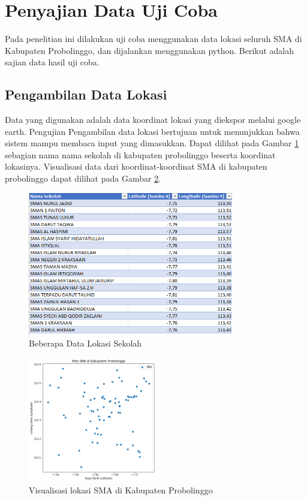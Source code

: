 \section{Penyajian Data Uji Coba}

Pada penelitian ini dilakukan uji coba menggunakan data lokasi seluruh SMA di Kabupaten Probolinggo, dan dijalankan menggunakan python. Berikut adalah sajian data hasil uji coba.

\subsection{Pengambilan Data Lokasi}

Data yang digunakan adalah data koordinat lokasi yang diekspor melalui google earth. Pengujian Pengambilan data lokasi bertujuan untuk menunjukkan bahwa sistem 
mampu membaca input yang dimasukkan. Dapat dilihat pada Gambar \ref{fig:datalok} sebagian nama nama sekolah di kabupaten probolinggo beserta koordinat lokasinya. Visualisasi data dari koordinat-koordinat SMA di kabupaten probolinggo dapat dilihat pada Gambar \ref{fig:petasma}.

\begin{figure}[h!]
  \centering
  \includegraphics[width=0.8\textwidth]{data lokasi sekolah.png}
  \caption{Beberapa Data Lokasi Sekolah}
  \label{fig:datalok}
\end{figure}

\begin{figure}[h!]
  \centering
  \includegraphics[width=0.5\textwidth]{peta sma.png}
  \caption{Visualisasi lokasi SMA di Kabupaten Probolinggo}
  \label{fig:petasma}
\end{figure}

